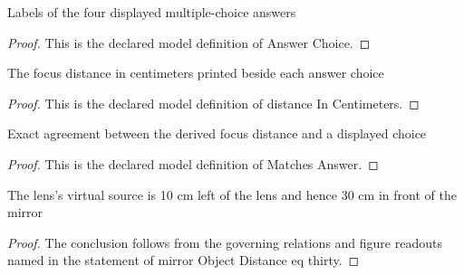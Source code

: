 \begin{definition}
  \label{def:physics:phyx-mini-0076:phyxminiproblems-problemphyxmini0076-answerchoice}
  Labels of the four displayed multiple-choice answers
\end{definition}
\begin{proof}
  This is the declared model definition of Answer Choice.
\end{proof}
\begin{definition}
  \label{def:physics:phyx-mini-0076:phyxminiproblems-problemphyxmini0076-answerchoice-distanceincentimeters}
  The focus distance in centimeters printed beside each answer choice
\end{definition}
\begin{proof}
  This is the declared model definition of distance In Centimeters.
\end{proof}
\begin{definition}
  \label{def:physics:phyx-mini-0076:phyxminiproblems-problemphyxmini0076-matchesanswer}
  Exact agreement between the derived focus distance and a displayed choice
\end{definition}
\begin{proof}
  This is the declared model definition of Matches Answer.
\end{proof}
\begin{lemma}
  \label{lem:physics:phyx-mini-0076:phyxminiproblems-problemphyxmini0076-mirrorobjectdistance-eq-thirty}
  The lens's virtual source is 10 cm left of the lens and hence 30 cm in front of the mirror
\end{lemma}
\begin{proof}
  The conclusion follows from the governing relations and figure readouts named in the statement of mirror Object Distance eq thirty.
\end{proof}
